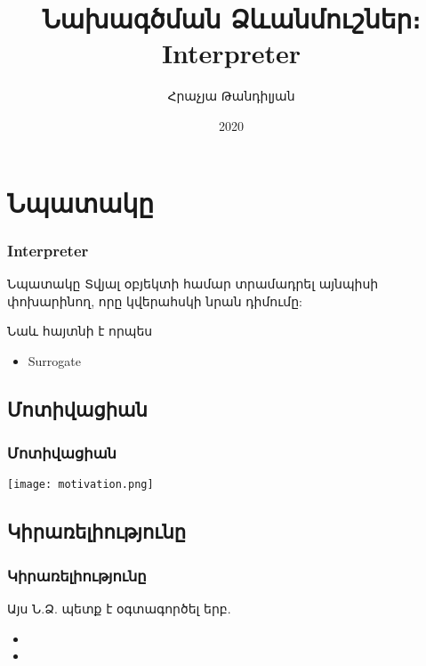 \documentclass{beamer}
\begin{document}
\title[Interpreter]{Նախագծման Ձևանմուշներ։ Interpreter}
\author[Հրաչյա Թանդիլյան\copyright]{Հրաչյա Թանդիլյան}
\date{2020}

\begin{frame}
\titlepage
\end{frame}

\section{Նպատակը}
\begin{frame}\frametitle{Interpreter}
\begin{block}{Նպատակը}
    Տվյալ օբյեկտի համար տրամադրել այնպիսի փոխարինող, որը կվերահսկի նրան դիմումը:
\end{block}
\vfill
Նաև հայտնի է որպես
\begin{itemize}
    \item Surrogate
\end{itemize}
\end{frame}

\subsection{Մոտիվացիան}
\begin{frame}\frametitle{Մոտիվացիան}
\begin{center}
    \texttt{[image: motivation.png]}
\end{center}
\end{frame}

\subsection{Կիրառելիությունը}
\begin{frame}\frametitle{Կիրառելիությունը}
Այս Ն.Ձ. պետք է օգտագործել երբ.
\vspace{0.5cm}
\begin{itemize}
    \item
    \item
\end{itemize}
\end{frame}
\end{document}
